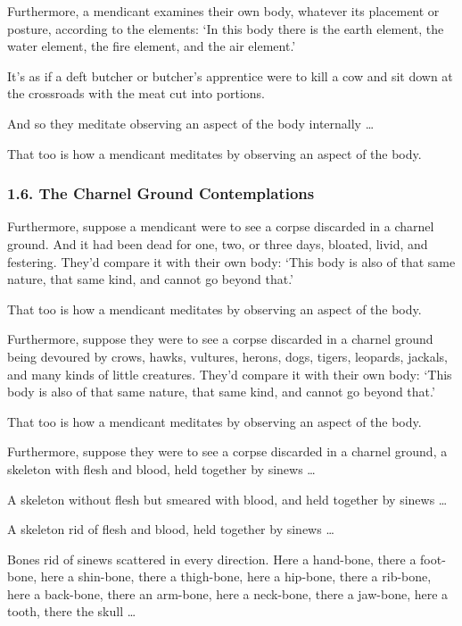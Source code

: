 \documentclass[12pt,openany]{book}%
\begin{document}
Furthermore, a mendicant examines their own body, whatever its placement or posture, according to the elements: ‘In this body there is the earth element, the water element, the fire element, and the air element.’ 

It’s as if a deft butcher or butcher’s apprentice were to kill a cow and sit down at the crossroads with the meat cut into portions. 

And so they meditate observing an aspect of the body internally … 

That too is how a mendicant meditates by observing an aspect of the body. 

\subsubsection*{1.6. The Charnel Ground Contemplations }

Furthermore, suppose a mendicant were to see a corpse discarded in a charnel ground. And it had been dead for one, two, or three days, bloated, livid, and festering. They’d compare it with their own body: ‘This body is also of that same nature, that same kind, and cannot go beyond that.’ 

That too is how a mendicant meditates by observing an aspect of the body. 

Furthermore, suppose they were to see a corpse discarded in a charnel ground being devoured by crows, hawks, vultures, herons, dogs, tigers, leopards, jackals, and many kinds of little creatures. They’d compare it with their own body: ‘This body is also of that same nature, that same kind, and cannot go beyond that.’ 

That too is how a mendicant meditates by observing an aspect of the body. 

Furthermore, suppose they were to see a corpse discarded in a charnel ground, a skeleton with flesh and blood, held together by sinews … 

A skeleton without flesh but smeared with blood, and held together by sinews … 

A skeleton rid of flesh and blood, held together by sinews … 

Bones rid of sinews scattered in every direction. Here a hand-bone, there a foot-bone, here a shin-bone, there a thigh-bone, here a hip-bone, there a rib-bone, here a back-bone, there an arm-bone, here a neck-bone, there a jaw-bone, here a tooth, there the skull … 
\end{document}
